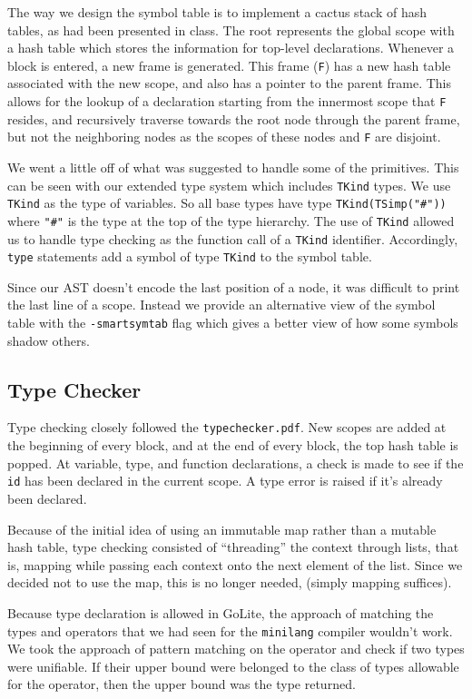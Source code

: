 \documentclass{article}
\begin{document}
The way we design the symbol table is to implement a cactus stack of hash tables, as had been presented in class. The root represents the global scope with a hash table which stores the information for top-level declarations. Whenever a block is entered, a new frame is generated. This frame (\verb|F|) has a new hash table associated with the new scope, and also has a pointer to the parent frame. This allows for the lookup of a declaration starting from the innermost scope that \verb|F| resides, and recursively traverse towards the root node through the parent frame, but not the neighboring nodes as the scopes of these nodes and \verb|F| are disjoint.

We went a little off of what was suggested to handle some of the primitives. This can be seen with our extended type system which includes \verb|TKind| types. We use \verb|TKind| as the type of variables. So all base types have type \verb|TKind(TSimp("#"))| where \verb|"#"| is the type at the top of the type hierarchy. The use of \verb|TKind| allowed us to handle type checking as the function call of a \verb|TKind| identifier. Accordingly, \verb|type| statements add a symbol of type \verb|TKind| to the symbol table.

Since our AST doesn't encode the last position of a node, it was difficult to print the last line of a scope. Instead we provide an alternative view of the symbol table with the \verb|-smartsymtab| flag which gives a better view of how some symbols shadow others.

\subsection{Type Checker}
Type checking closely followed the \verb|typechecker.pdf|. New scopes are added at the beginning of every block, and at the end of every block, the top hash table is popped. At variable, type, and function declarations, a check is made to see if the \verb|id| has been declared in the current scope. A type error is raised if it's already been declared.

Because of the initial idea of using an immutable map rather than a mutable hash table, type checking consisted of ``threading'' the context through lists, that is, mapping while passing each context onto the next element of the list. Since we decided not to use the map, this is no longer needed, (simply mapping suffices).

Because type declaration is allowed in GoLite, the approach of matching the types and operators that we had seen for the \verb|minilang| compiler wouldn't work. We took the approach of pattern matching on the operator and check if two types were unifiable. If their upper bound were belonged to the class of types allowable for the operator, then the upper bound was the type returned.
\end{document}
